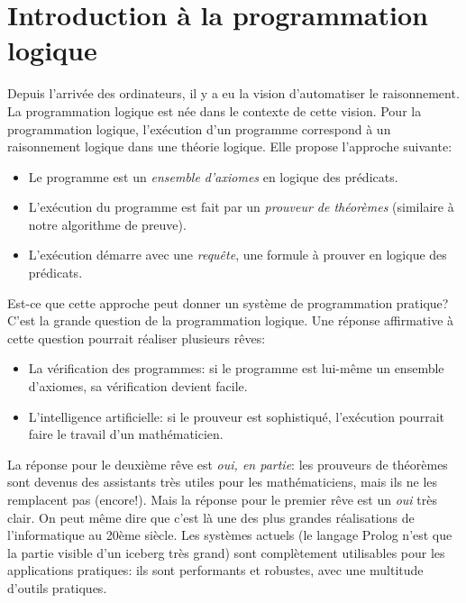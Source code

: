 
\chapter{Introduction à la programmation logique}
\label{prolog}

Depuis l'arrivée des ordinateurs, il y a eu la vision d'automatiser le raisonnement.
La programmation logique est née dans le contexte de cette vision.
Pour la programmation logique, l'exécution d'un programme correspond à un raisonnement logique dans une théorie logique.
Elle propose l'approche suivante:
\begin{itemize} 
\item Le programme est un {\em ensemble d'axiomes} en logique des prédicats.
\item L'exécution du programme est fait par un {\em prouveur de théorèmes} (similaire à notre algorithme de preuve).
\item L'exécution démarre avec une {\em requête}, une formule à prouver en logique des prédicats.
\end{itemize}
Est-ce que cette approche peut donner un système de programmation pratique?
C'est la grande question de la programmation logique.
Une réponse affirmative à cette question pourrait réaliser plusieurs rêves:
\begin{itemize}
\item La vérification des programmes: si le programme est lui-même un ensemble d'axiomes, sa vérification devient facile.
\item L'intelligence artificielle: si le prouveur est sophistiqué, l'exécution pourrait faire le travail d'un mathématicien.
\end{itemize}
La réponse pour le deuxième rêve est {\em oui, en partie}: les prouveurs de théorèmes sont devenus
des assistants très utiles pour les mathématiciens, mais ils ne les remplacent pas (encore!).
Mais la réponse pour le premier rêve est un {\em oui} très clair.
On peut même dire que c'est là une des plus grandes réalisations de l'informatique au 20ème siècle.
Les systèmes actuels (le langage Prolog n'est que la partie visible d'un iceberg très grand)
sont complètement utilisables pour les applications pratiques:
ils sont performants et robustes, avec une multitude d'outils pratiques.

